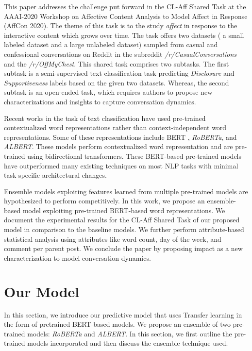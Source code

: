 \documentclass[runningheads]{llncs}
\begin{document}
This paper addresses the challenge put forward in the CL-Aff Shared Task at the AAAI-2020 Workshop on Affective Content Analysis to Model Affect in Response (AffCon 2020). The theme of this task is to the study \emph{affect} in response to the interactive content which grows over time. The task offers two datasets ( a small labeled dataset and a large unlabeled dataset) sampled from casual and confessional conversations on Reddit in the subreddit \textit{/r/CasualConversations} and the \textit{/r/OffMyChest}. This shared task comprises two subtasks. The first subtask is a semi-supervised text classification task predicting \textit{Disclosure} and \textit{Supportiveness} labels based on the given two datasets. Whereas, the second subtask is an open-ended task, which requires authors to propose new characterizations and insights to capture conversation dynamics.

Recent works in the task of text classification have used pre-trained contextualized word representations rather than context-independent word representations. Some of these representations include BERT \cite{Devlin2019}, \textit{RoBERTa}\cite{2020roberta}, and \textit{ALBERT}\cite{2020albert}. These models perform contextualized word representation and are pre-trained using bidirectional transformers\cite{vaswaniattention}. These BERT-based pre-trained models have outperformed many existing techniques on most NLP tasks with minimal task-specific architectural changes. 

Ensemble models exploiting features learned from multiple pre-trained models are hypothesized to perform competitively. In this work, we propose an ensemble-based model exploiting pre-trained BERT-based word representations. We document the experimental results for the CL-Aff Shared Task of our proposed model in comparison to the baseline models. We further perform attribute-based statistical analysis using attributes like word count, day of the week, and comment per parent post. We conclude the paper by proposing impact as a new characterization to model conversation dynamics.
\section{Our Model}
In this section, we introduce our predictive model that uses Transfer learning in the form of pretrained BERT-based models. We propose an ensemble of two pre-trained models: \textit{RoBERTa} and \textit{ALBERT}. In this section, we first outline the pre-trained models incorporated and then discuss the ensemble technique used.
\end{document}
